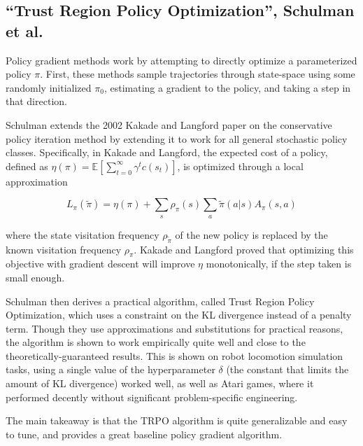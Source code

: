 \documentclass[final]{beamer}
\begin{document}
\begin{frame}[t]
\begin{multicols}{3}
\section{``Trust Region Policy Optimization'', Schulman et al.}


Policy gradient methods work by attempting to directly optimize a parameterized policy $\pi$.  First, these methods sample trajectories through state-space using some randomly initialized $\pi_0$, estimating a gradient to the policy, and taking a step in that direction.

Schulman extends the 2002 Kakade and Langford paper on the conservative policy iteration method by extending it to work for all general stochastic policy classes. Specifically, in Kakade and Langford, the expected cost of a policy, defined as $\eta(\pi) = \mathbb{E} [ \sum_{t=0}^\infty \gamma^t c(s_t)]$, is optimized through a local approximation

$$ L_\pi(\tilde{\pi}) = \eta(\pi) + \sum_s \rho_\pi (s) \sum_a \tilde{\pi} (a|s) A_\pi (s,a) $$

where the state visitation frequency $\rho_\tilde{\pi}$ of the new policy is replaced by the known visitation frequency $\rho_\pi$. Kakade and Langford proved that optimizing this objective with gradient descent will improve $\eta$ monotonically, if the step taken is small enough.


Schulman then derives a practical algorithm, called Trust Region Policy Optimization, which uses a constraint on the KL divergence instead of a penalty term. Though they use approximations and substitutions for practical reasons, the algorithm is shown to work empirically quite well and close to the theoretically-guaranteed results. This is shown on robot locomotion simulation tasks, using a single value of the hyperparameter $\delta$ (the constant that limits the amount of KL divergence) worked well, as well as Atari games, where it performed decently without significant problem-specific engineering.

The main takeaway is that the TRPO algorithm is quite generalizable and easy to tune, and provides a great baseline policy gradient algorithm.



\end{multicols}
\end{frame}
\end{document}
